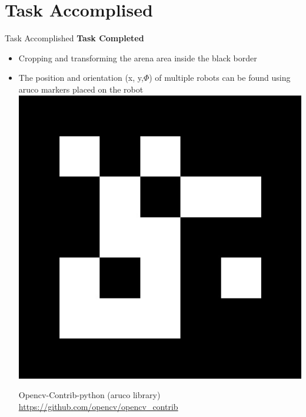 \documentclass[11pt, a4paper]{beamer}
\begin{document}
\section{Task Accomplised}
\begin{frame}{Task Accomplished}
	\textbf{Task Completed}
	\begin{itemize}	
	\item Cropping and transforming the arena area inside the black border
		\item The position and orientation (x, y,$\Phi$) of multiple robots can be found using aruco markers placed on the robot\\
		\includegraphics[scale =.1]{images/aruco.jpg}
		
		
		 Opencv-Contrib-python (aruco library)\\ \url{https://github.com/opencv/opencv_contrib}
\end{itemize}
\end{frame}	
\end{document}
